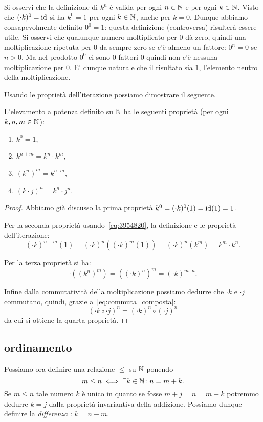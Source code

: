 Si osservi che la definizione di $k^n$ è valida per ogni $n\in {\mathbb N}$ e 
per ogni $k\in {\mathbb N}$. 
Visto che $(\cdot k)^0 = \mathrm{id}$ si ha $k^0=1$ per ogni $k\in {\mathbb N}$,
anche per $k=0$.
Dunque abbiamo consapevolmente definito $0^0=1$:
questa definizione (controversa) risulterà essere utile.
Si osservi che qualunque numero moltiplicato per $0$ dà zero, 
quindi una moltiplicazione ripetuta per $0$ da sempre zero se c'è almeno 
un fattore: $0^n=0$ se $n>0$. 
Ma nel prodotto $0^0$ ci sono $0$ fattori $0$ quindi non c'è nessuna 
moltiplicazione per $0$. 
E' dunque naturale che il risultato sia $1$, 
l'elemento neutro della moltiplicazione.

Usando le proprietà dell'iterazione possiamo dimostrare il seguente.
\begin{theorem}
  L'elevamento a potenza definito su ${\mathbb N}$ ha le seguenti proprietà
  (per ogni $k,n,m\in {\mathbb N}$):
  \begin{enumerate}
    \item $k^0 = 1$,
    \item $k^{n+m} = k^n \cdot k^m$,
    \item $(k^n)^m = k^{n\cdot m}$,
    \item $(k\cdot j)^n = k^n\cdot j^n$. 
  \end{enumerate}
\end{theorem}
%
\begin{proof}
Abbiamo già discusso la prima proprietà $k^0 = (\cdot k)^0(1) = \mathrm{id}(1) = 1$.

Per la seconda proprietà usando~\eqref{eq:3954820},
la definizione e le proprietà dell'iterazione:
\[
(\cdot k)^{n+m}(1)
= (\cdot k)^n((\cdot k)^m(1))
= (\cdot k)^n(k^m)
= k^m \cdot k^n.
\]

Per la terza proprietà
si ha: 
\[
\cdot((k^n)^m) 
= ((\cdot k)^n)^m
= (\cdot k)^{m\cdot n}.
\]

Infine dalla commutatività della moltiplicazione 
possiamo dedurre che $\cdot k$ e $\cdot j$ commutano,
quindi, grazie a~\eqref{eq:commuta_composta}:
\[
(\cdot k\circ \cdot j)^n = (\cdot k)^n \circ (\cdot j)^n  
\]
da cui si ottiene la quarta proprietà.
\end{proof}

\subsection{ordinamento}
Possiamo ora definire una relazione $\le$ su ${\mathbb N}$ ponendo 
\[
  m \le n \iff \exists k\in {\mathbb N}\colon n = m+k.  
\]
Se $m\le n$ tale numero 
$k$ è unico in quanto se fosse $m+j=n=m+k$ potremmo dedurre $k=j$
dalla proprietà invariantiva della addizione. 
Possiamo dunque definire la \emph{differenza}%
%
: $k=n-m$.

